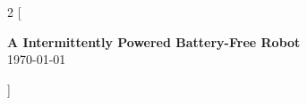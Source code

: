 \documentclass[a4paper, 9pt, oneside]{article}
\begin{document}
	\begin{multicols}{2}
		[
		\begin{center}
		{\Large{\textbf{A Intermittently Powered Battery-Free Robot}}} \\
		\vspace{0.5em}
		\today				
		\end{center}
		]
		
		
		
		
		
		
		

	\end{multicols}
\end{document}
